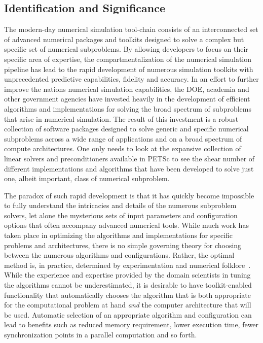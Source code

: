 \subsection{Identification and Significance}
\label{sec:introduction}

The modern-day numerical simulation tool-chain consists of an interconnected set of advanced 
numerical packages and toolkits designed to solve a complex but specific set of numerical subproblems. By allowing developers to focus on their specific area of expertise, the compartmentalization of the numerical simulation pipeline has lead to the rapid development of numerous simulation toolkits with unprecedented predictive capabilities, fidelity and accuracy. In an effort to further improve the nations numerical simulation capabilities, the DOE, academia and other government agencies have invested heavily in the development of efficient algorithms and implementations for solving the broad spectrum of subproblems that arise in numerical simulation.  The result of this investment is a robust collection of software packages designed to solve generic and specific numerical subproblems across a wide range of applications and on a broad spectrum of compute architectures. One only needs to look at the expansive collection of linear solvers and preconditioners available in PETSc to see the shear number of different implementations and algorithms that have been developed to solve just one, albeit important, class of numerical subproblem.  

The paradox of such rapid development is that it has quickly become impossible to fully understand the intricacies and details of the numerous subproblem solvers, let alone the mysterious sets of input parameters and configuration options that often accompany advanced numerical tools. While much work has taken place in optimizing the algorithms and implementations for specific problems and architectures, there is no simple governing theory for choosing between the numerous algorithms and configurations. Rather, the optimal method is, in practice, determined by experimentation and numerical folklore~\cite{EijkFuen2010:multistage}. While the experience and expertise provided by the domain scientists in tuning the algorithms cannot be underestimated, it is desirable to have toolkit-enabled functionality that automatically chooses the algorithm that is both appropriate for the computational problem at hand \emph{and} the computer architecture that will be used. Automatic selection of an appropriate algorithm and configuration can lead to benefits such as reduced memory requirement, lower execution time, fewer synchronization points in a parallel computation and so forth. 

